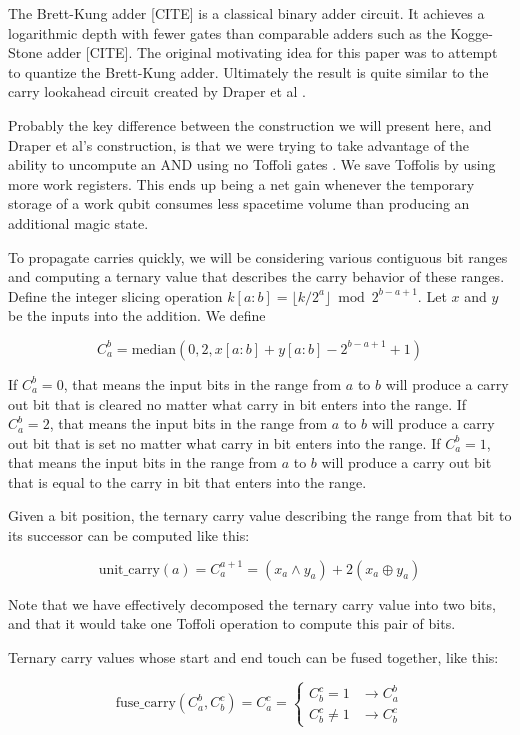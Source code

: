 \documentclass[onecolumn,unpublished]{quantumarticle}
\theoremstyle{definition}
\theoremstyle{definition}
\theoremstyle{definition}
\begin{document}
The Brett-Kung adder [CITE] is a classical binary adder circuit.
It achieves a logarithmic depth with fewer gates than comparable adders such as the Kogge-Stone adder [CITE].
The original motivating idea for this paper was to attempt to quantize the Brett-Kung adder.
Ultimately the result is quite similar to the carry lookahead circuit created by Draper et al \cite{draper2004lookaheadadder}.

Probably the key difference between the construction we will present here, and Draper et al's construction, is that we were trying to take advantage of the ability to uncompute an AND using no Toffoli gates \cite{gidney2018halving}.
We save Toffolis by using more work registers.
This ends up being a net gain whenever the temporary storage of a work qubit consumes less spacetime volume than producing an additional magic state.

To propagate carries quickly, we will be considering various contiguous bit ranges and computing a ternary value that describes the carry behavior of these ranges.
Define the integer slicing operation $k[a:b] = \lfloor k/2^a \rfloor \bmod 2^{b-a+1}$.
Let $x$ and $y$ be the inputs into the addition.
We define

$$C_a^b = \text{median}(0, 2, x[a:b] + y[a:b] - 2^{b - a + 1} + 1)$$

If $C_a^b = 0$, that means the input bits in the range from $a$ to $b$ will produce a carry out bit that is cleared no matter what carry in bit enters into the range.
If $C_a^b = 2$, that means the input bits in the range from $a$ to $b$ will produce a carry out bit that is set no matter what carry in bit enters into the range.
If $C_a^b = 1$, that means the input bits in the range from $a$ to $b$ will produce a carry out bit that is equal to the carry in bit that enters into the range.

Given a bit position, the ternary carry value describing the range from that bit to its successor can be computed like this:

$$\text{unit\_carry}(a) = C_a^{a+1} = (x_a \land y_a) + 2 (x_a \oplus y_a)$$

Note that we have effectively decomposed the ternary carry value into two bits, and that it would take one Toffoli operation to compute this pair of bits.

Ternary carry values whose start and end touch can be fused together, like this:

$$\text{fuse\_carry}(C_a^b, C_b^c) = C_a^c = \begin{cases}
C_b^c = 1 & \rightarrow C_a^b \\
C_b^c \neq 1 & \rightarrow C_b^c
\end{cases}$$
\end{document}
